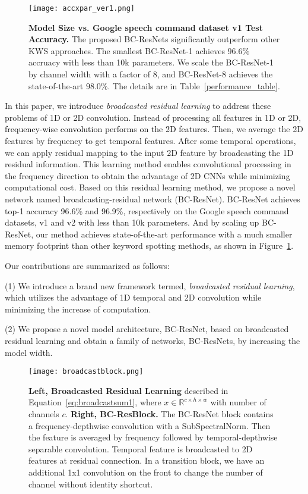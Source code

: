 \documentclass[a4paper]{article}
\newcommand\bg[1]{\textcolor{blue}{#1}}
\renewcommand\bg[1]{\textcolor{black}{#1}}
\begin{document}
\begin{figure}[t]
  \centering
  \texttt{[image: accxpar\_ver1.png]}
  \vskip -0.05in
  \caption{\textbf{Model Size vs. Google speech command dataset v1 Test Accuracy.} The proposed BC-ResNets significantly outperform other KWS approaches. The smallest BC-ResNet-1 achieves $96.6 \%$ accruacy with less than 10k parameters. We scale the BC-ResNet-1 by channel width with a factor of 8, and BC-ResNet-8 achieves the state-of-the-art $98.0 \%$. The details are in Table~\ref{performance_table}.}
  \label{accxpar}
\end{figure}

In this paper, we introduce \textit{broadcasted residual learning} to address these problems of 1D or 2D convolution. Instead of processing all features in 1D or 2D, 
\bg{frequency-wise convolution performs on the 2D features.}
Then, we average the 2D features by frequency to get temporal features. After some temporal operations, we can apply residual mapping to the input 2D feature by broadcasting the 1D residual information. This learning method enables convolutional processing in the frequency direction to obtain the advantage of 2D CNNs while minimizing computational cost. Based on this residual learning method, we propose a novel network named broadcasting-residual network (BC-ResNet). BC-ResNet achieves top-1 accuracy 96.6\% and 96.9\%, respectively on the Google speech command datasets, v1 and v2 \cite{speechdataset} with less than 10k parameters. And by scaling up BC-ResNet, our method achieves state-of-the-art performance with a much smaller memory footprint than other keyword spotting methods, as shown in Figure~\ref{accxpar}.

Our contributions are summarized as follows:

(1) We introduce a brand new framework termed, \textit{broadcasted residual learning}, which utilizes the advantage of 1D temporal and 2D convolution while minimizing the increase of computation.

(2) We propose a novel model architecture, BC-ResNet, based on broadcasted residual learning and obtain a family of networks, BC-ResNets, by increasing the model width.

\begin{figure*}[t]
  \centering
  \texttt{[image: broadcastblock.png]}
  \vskip -0.15in
  \caption{\textbf{Left, Broadcasted Residual Learning} described in Equation~\ref{eq:broadcastsum1}, where $x\in \mathbb{R}^{c\times h \times w}$ with number of channels $c$. \textbf{Right, BC-ResBlock.} The BC-ResNet block contains a frequency-depthwise convolution with a SubSpectralNorm. Then the feature is averaged by frequency followed by temporal-depthwise separable convolution. 
Temporal feature is broadcasted to 2D features at residual connection. In a transition block, we have an additional 1x1 convolution on the front to change the number of channel without identity shortcut.}
  \label{broadcastblock}
\end{figure*}
\end{document}
